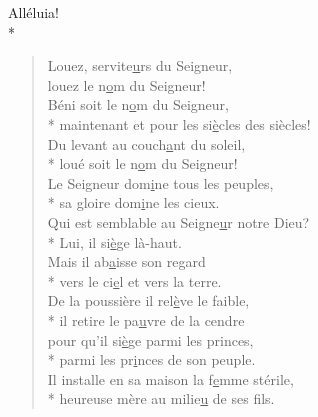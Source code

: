 Alléluia! \\*
\begin{verse}
Louez, servite\underline{u}rs du Seigneur, \\
louez le n\underline{o}m du Seigneur! \\
Béni soit le n\underline{o}m du Seigneur, \\*
maintenant et pour les si\underline{è}cles des siècles! \\
Du levant au couch\underline{a}nt du soleil, \\*
loué soit le n\underline{o}m du Seigneur! \\

Le Seigneur dom\underline{i}ne tous les peuples, \\*
sa gloire dom\underline{i}ne les cieux. \\
Qui est semblable au Seigne\underline{u}r notre Dieu? \\*
Lui, il si\underline{è}ge là-haut. \\
Mais il ab\underline{a}isse son regard \\*
vers le ci\underline{e}l et vers la terre. \\

De la poussière il rel\underline{è}ve le faible, \\*
il retire le pa\underline{u}vre de la cendre \\
pour qu’il si\underline{è}ge parmi les princes, \\*
parmi les pr\underline{i}nces de son peuple. \\
Il installe en sa maison la f\underline{e}mme stérile, \\*
heureuse mère au milie\underline{u} de ses fils. \\
\end{verse}

